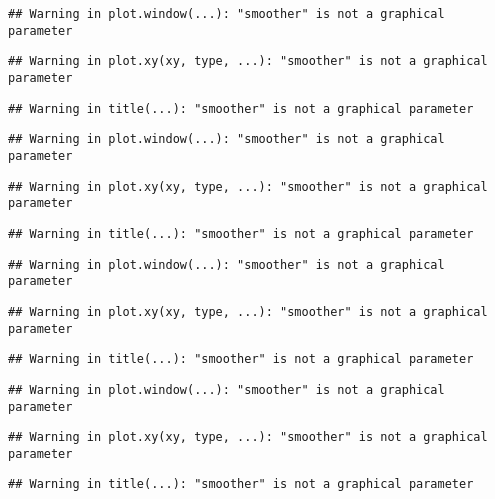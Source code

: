 \documentclass[
]{article}
\begin{document}
\begin{verbatim}
## Warning in plot.window(...): "smoother" is not a graphical parameter
\end{verbatim}

\begin{verbatim}
## Warning in plot.xy(xy, type, ...): "smoother" is not a graphical parameter
\end{verbatim}

\begin{verbatim}
## Warning in title(...): "smoother" is not a graphical parameter
\end{verbatim}

\begin{verbatim}
## Warning in plot.window(...): "smoother" is not a graphical parameter
\end{verbatim}

\begin{verbatim}
## Warning in plot.xy(xy, type, ...): "smoother" is not a graphical parameter
\end{verbatim}

\begin{verbatim}
## Warning in title(...): "smoother" is not a graphical parameter
\end{verbatim}

\begin{verbatim}
## Warning in plot.window(...): "smoother" is not a graphical parameter
\end{verbatim}

\begin{verbatim}
## Warning in plot.xy(xy, type, ...): "smoother" is not a graphical parameter
\end{verbatim}

\begin{verbatim}
## Warning in title(...): "smoother" is not a graphical parameter
\end{verbatim}

\begin{verbatim}
## Warning in plot.window(...): "smoother" is not a graphical parameter
\end{verbatim}

\begin{verbatim}
## Warning in plot.xy(xy, type, ...): "smoother" is not a graphical parameter
\end{verbatim}

\begin{verbatim}
## Warning in title(...): "smoother" is not a graphical parameter
\end{verbatim}
\end{document}
